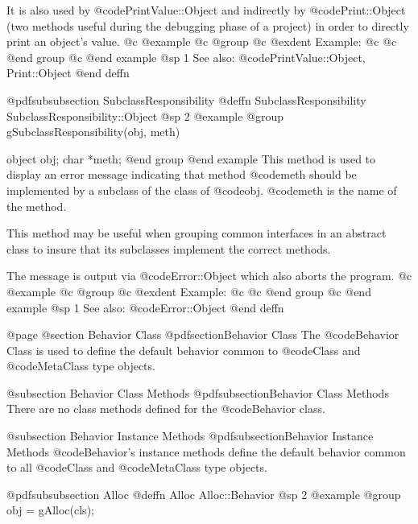 It is also used by @code{PrintValue::Object} and indirectly by
@code{Print::Object} (two methods useful during the debugging phase of a
project) in order to directly print an object's value.
@c @example
@c @group
@c @exdent Example:
@c 
@c @end group
@c @end example
@sp 1
See also:  @code{PrintValue::Object, Print::Object}
@end deffn















@pdfsubsubsection {SubclassResponsibility}
@deffn {SubclassResponsibility} SubclassResponsibility::Object
@sp 2
@example
@group
gSubclassResponsibility(obj, meth)

object  obj;
char    *meth;
@end group
@end example
This method is used to display an error message indicating that method
@code{meth} should be implemented by a subclass of the class of
@code{obj}.  @code{meth} is the name of the method.

This method may be useful when grouping common interfaces in an
abstract class to insure that its subclasses implement the correct
methods.

The message is output via @code{Error::Object} which also aborts the
program.
@c @example
@c @group
@c @exdent Example:
@c 
@c @end group
@c @end example
@sp 1
See also:  @code{Error::Object}
@end deffn










@page
@section Behavior Class
@pdfsection{Behavior Class}
The @code{Behavior} Class is used to define the default behavior
common to @code{Class} and @code{MetaClass} type objects.

@subsection Behavior Class Methods
@pdfsubsection{Behavior Class Methods}
There are no class methods defined for the @code{Behavior} class.

@subsection Behavior Instance Methods
@pdfsubsection{Behavior Instance Methods}
@code{Behavior}'s instance methods define the default behavior common to all
@code{Class} and @code{MetaClass} type objects.





@pdfsubsubsection {Alloc}
@deffn {Alloc} Alloc::Behavior
@sp 2
@example
@group
obj = gAlloc(cls);

